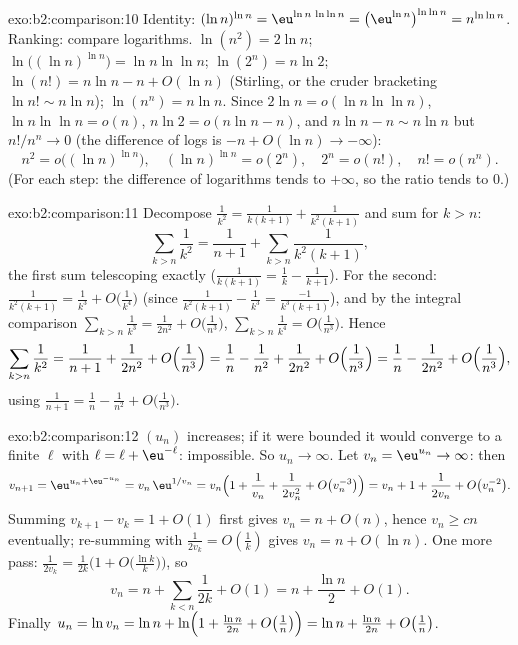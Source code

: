 \begin{solution}{exo:b2:comparison:10}
Identity: $(\ln n)^{\ln n} = \eu^{\ln n\,\ln\ln n} =
\bigl(\eu^{\ln n}\bigr)^{\ln\ln n} = n^{\ln\ln n}$. Ranking:
compare logarithms. $\ln(n^2) = 2\ln n$; $\ln\bigl((\ln
n)^{\ln n}\bigr) = \ln n\ln\ln n$; $\ln(2^n) = n\ln2$;
$\ln(n!) = n\ln n - n + O(\ln n)$ (Stirling, or the cruder
bracketing $\ln n! \sim n\ln n$); $\ln(n^n) = n\ln n$. Since
$2\ln n = o(\ln n\ln\ln n)$, $\ln n\ln\ln n = o(n)$, $n\ln 2 =
o(n\ln n - n)$, and $n \ln n - n \sim n\ln n$ but $n! / n^n \to
0$ (the difference of logs is $-n + O(\ln n) \to -\infty$):
\[
n^2 = o\bigl((\ln n)^{\ln n}\bigr),\quad
(\ln n)^{\ln n} = o(2^n),\quad
2^n = o(n!),\quad
n! = o(n^n).
\]
(For each step: the difference of logarithms tends to
$+\infty$, so the ratio tends to $0$.)
\end{solution}

\begin{solution}{exo:b2:comparison:11}
Decompose $\frac1{k^2} = \frac1{k(k+1)} + \frac1{k^2(k+1)}$ and
sum for $k > n$:
\[
\sum_{k>n}\frac1{k^2} = \frac1{n+1} +
\sum_{k>n}\frac{1}{k^2(k+1)} ,
\]
the first sum telescoping exactly ($\frac1{k(k+1)} = \frac1k -
\frac1{k+1}$). For the second: $\frac{1}{k^2(k+1)} = \frac1{k^3}
+ O\bigl(\frac1{k^4}\bigr)$ (since $\frac{1}{k^2(k+1)} -
\frac1{k^3} = \frac{-1}{k^3(k+1)}$), and by the
integral comparison $\sum_{k>n}\frac1{k^3} = \frac1{2n^2} +
O\bigl(\frac1{n^3}\bigr)$, $\sum_{k>n}\frac1{k^4} =
O\bigl(\frac1{n^3}\bigr)$. Hence
\[
\sum_{k>n}\frac1{k^2}
= \frac1{n+1} + \frac{1}{2n^2} + O\Bigl(\frac1{n^3}\Bigr)
= \frac1n - \frac1{n^2} + \frac{1}{2n^2} +
O\Bigl(\frac1{n^3}\Bigr)
= \frac1n - \frac{1}{2n^2} + O\Bigl(\frac1{n^3}\Bigr),
\]
using $\frac1{n+1} = \frac1n - \frac1{n^2} +
O\bigl(\frac1{n^3}\bigr)$.
\end{solution}

\begin{solution}{exo:b2:comparison:12}
$(u_n)$ increases; if it were bounded it would converge to a
finite $\ell$ with $\ell = \ell + \eu^{-\ell}$: impossible. So
$u_n \to \infty$. Let $v_n = \eu^{u_n} \to \infty$: then
\[
v_{n+1} = \eu^{u_n + \eu^{-u_n}} = v_n\,\eu^{1/v_n}
= v_n\Bigl(1 + \frac1{v_n} + \frac1{2v_n^2} +
O\bigl(v_n^{-3}\bigr)\Bigr)
= v_n + 1 + \frac{1}{2v_n} + O\bigl(v_n^{-2}\bigr).
\]
Summing $v_{k+1} - v_k = 1 + O(1)$ first gives $v_n = n +
O(n)$, hence $v_n \geq cn$ eventually; re-summing with
$\frac1{2v_k} = O(\frac1k)$ gives $v_n = n + O(\ln n)$. One more
pass: $\frac{1}{2v_k} = \frac{1}{2k}\bigl(1 +
O\bigl(\tfrac{\ln k}k\bigr)\bigr)$, so
\[
v_n = n + \sum_{k<n}\frac1{2k} + O(1) = n + \frac{\ln n}2 +
O(1).
\]
Finally $u_n = \ln v_n = \ln n + \ln\Bigl(1 + \frac{\ln n}{2n} +
O\bigl(\tfrac1n\bigr)\Bigr) = \ln n + \frac{\ln n}{2n} +
O\bigl(\tfrac1n\bigr)$.
\end{solution}

